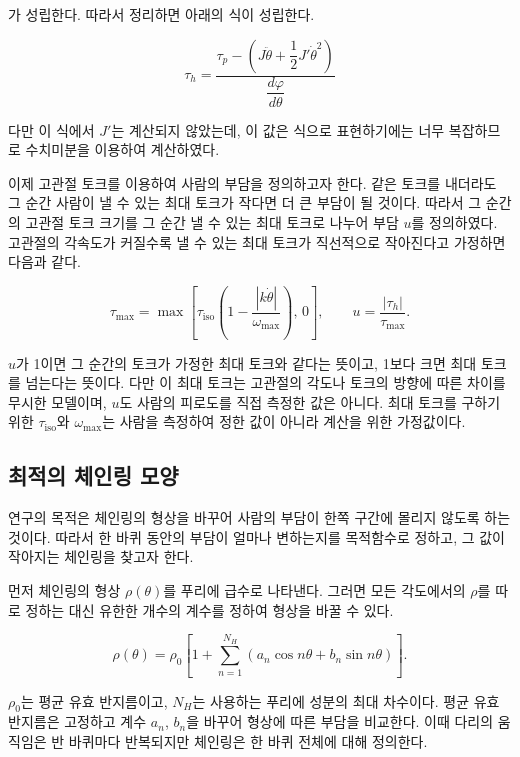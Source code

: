 가 성립한다. 따라서 정리하면 아래의 식이 성립한다.

\[\tau_h=\dfrac{\tau_p-\left(J\ddot{\theta}+\dfrac12J'\dot{\theta}^2\right)}{\dfrac{d\varphi}{d\theta}}\]

다만 이 식에서 \(J'\)는 계산되지 않았는데, 이 값은 식으로 표현하기에는 너무 복잡하므로 수치미분을 이용하여 계산하였다.

이제 고관절 토크를 이용하여 사람의 부담을 정의하고자 한다. 같은 토크를 내더라도 그 순간 사람이 낼 수 있는 최대 토크가 작다면 더 큰 부담이 될 것이다. 따라서 그 순간의 고관절 토크 크기를 그 순간 낼 수 있는 최대 토크로 나누어 부담 \(u\)를 정의하였다. 고관절의 각속도가 커질수록 낼 수 있는 최대 토크가 직선적으로 작아진다고 가정하면 다음과 같다.

\begin{equation}
\tau_{\max}=
\max\left[\tau_{\mathrm{iso}}
\left(1-\frac{|k\dot{\theta}|}{\omega_{\max}}\right),\,0\right],
\qquad
u=\frac{|\tau_h|}{\tau_{\max}}.
\label{eq:me-burden}
\end{equation}

\(u\)가 1이면 그 순간의 토크가 가정한 최대 토크와 같다는 뜻이고, 1보다 크면 최대 토크를 넘는다는 뜻이다. 다만 이 최대 토크는 고관절의 각도나 토크의 방향에 따른 차이를 무시한 모델이며, \(u\)도 사람의 피로도를 직접 측정한 값은 아니다. 최대 토크를 구하기 위한 \(\tau_{\mathrm{iso}}\)와 \(\omega_{\max}\)는 사람을 측정하여 정한 값이 아니라 계산을 위한 가정값이다.

\subsection{최적의 체인링 모양}

연구의 목적은 체인링의 형상을 바꾸어 사람의 부담이 한쪽 구간에 몰리지 않도록 하는 것이다. 따라서 한 바퀴 동안의 부담이 얼마나 변하는지를 목적함수로 정하고, 그 값이 작아지는 체인링을 찾고자 한다.

먼저 체인링의 형상 \(\rho(\theta)\)를 푸리에 급수로 나타낸다. 그러면 모든 각도에서의 \(\rho\)를 따로 정하는 대신 유한한 개수의 계수를 정하여 형상을 바꿀 수 있다.

\begin{equation}
\rho(\theta)=\rho_0\left[
1+\sum_{n=1}^{N_H}\left(a_n\cos n\theta+b_n\sin n\theta\right)
\right].
\label{eq:me-rho}
\end{equation}

\(\rho_0\)는 평균 유효 반지름이고, \(N_H\)는 사용하는 푸리에 성분의 최대 차수이다. 평균 유효 반지름은 고정하고 계수 \(a_n\), \(b_n\)을 바꾸어 형상에 따른 부담을 비교한다. 이때 다리의 움직임은 반 바퀴마다 반복되지만 체인링은 한 바퀴 전체에 대해 정의한다.

